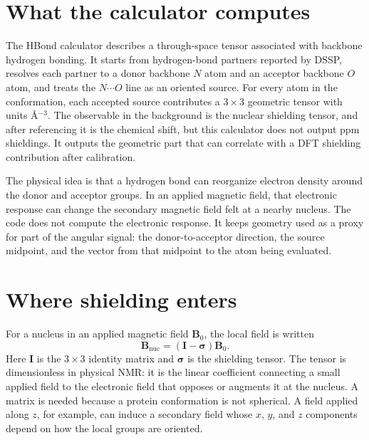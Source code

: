 \documentclass[11pt]{article}
\begin{document}

\section{What the calculator computes}

The HBond calculator describes a through-space tensor associated with
backbone hydrogen bonding. It starts from hydrogen-bond partners reported by
DSSP, resolves each partner to a donor backbone \(N\) atom and an acceptor
backbone \(O\) atom, and treats the \(N\cdots O\) line as an oriented source.
For every atom in the conformation, each accepted source contributes a
\(3\times 3\) geometric tensor with units \(\si{\angstrom^{-3}}\). The
observable in the background is the nuclear shielding tensor, and after
referencing it is the chemical shift, but this calculator does not output ppm
shieldings. It outputs the geometric part that can correlate with a DFT
shielding contribution after calibration.

The physical idea is that a hydrogen bond can reorganize electron density
around the donor and acceptor groups. In an applied magnetic field, that
electronic response can change the secondary magnetic field felt at a nearby
nucleus. The code does not compute the electronic response. It keeps geometry
used as a proxy for part of the angular signal: the donor-to-acceptor
direction, the source midpoint, and the vector from that midpoint to the atom
being evaluated.

\section{Where shielding enters}

For a nucleus in an applied magnetic field \(\bm B_0\), the local field is
written
\begin{equation}
  \bm B_{\mathrm{nuc}} = (\bm I-\bm\sigma)\bm B_0 .
  \label{eq:shielding}
\end{equation}
Here \(\bm I\) is the \(3\times 3\) identity matrix and \(\bm\sigma\) is the
shielding tensor. The tensor is dimensionless in physical NMR: it is the
linear coefficient connecting a small applied field to the electronic field
that opposes or augments it at the nucleus. A matrix is needed because a
protein conformation is not spherical. A field applied along \(z\), for
example, can induce a secondary field whose \(x\), \(y\), and \(z\) components
depend on how the local groups are oriented.
\end{document}
